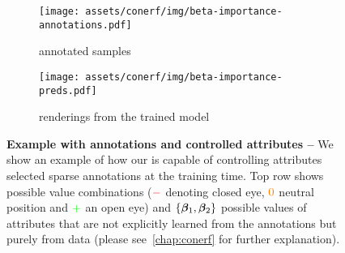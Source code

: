 \begin{figure}
  \centering
  \begin{subfigure}[t]{0.38\linewidth}
    \centering
    \texttt{[image: assets/conerf/img/beta-importance-annotations.pdf]}
    \caption{annotated samples}
  \end{subfigure}
  \hfill{}
  \begin{subfigure}[t]{0.595\linewidth}
    \centering
    \texttt{[image: assets/conerf/img/beta-importance-preds.pdf]}
    \caption{renderings from the trained model}
  \end{subfigure}
  \caption{{\bf Example with annotations and controlled attributes --}
    We show an example of how our \conerf is capable of controlling attributes
    selected sparse annotations at the training time.
    Top row shows possible value combinations ($\color{red}{-}$ denoting closed
    eye, $\color{orange}{0}$ neutral position and $\color{green}{+}$ an open eye)
    and $\{{\boldsymbol{\beta}}_1,{\boldsymbol{\beta}}_2\}$ possible values of attributes that are not
    explicitly learned from the annotations but purely from data (please
    see~\cref{chap:conerf} for further explanation).
  }
  \label{fig:conerf-teaser}
\end{figure}